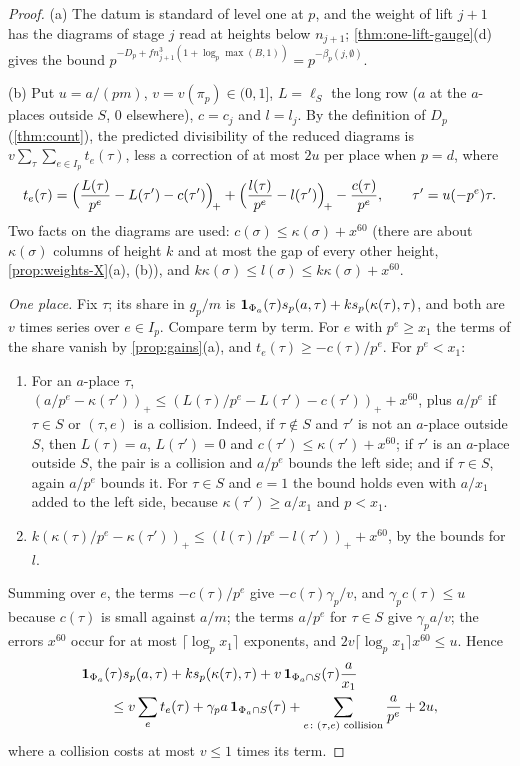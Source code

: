 \begin{proof}
(a) The datum is standard of level one at $p$, and the weight of lift $j+1$ has the diagrams of stage $j$ read at heights below $n_{j+1}$; \cref{thm:one-lift-gauge}(d) gives the bound $p^{-D_p+fn_{j+1}^3(1+\log_p\max(B,1))}=p^{-\beta_p(j,\emptyset)}$.

(b) Put $u=a/(pm)$, $v=v(\pi_p)\in(0,1]$, $L=\ell_S$ the long row ($a$ at the $a$-places outside $S$, $0$ elsewhere), $c=c_j$ and $l=l_j$. By the definition of $D_p$ (\cref{thm:count}), the predicted divisibility of the reduced diagrams is $v\sum_\tau\sum_{e\in I_p}t_e(\tau)$, less a correction of at most $2u$ per place when $p=d$, where
\[
  t_e(\tau)=\Bigl(\frac{L(\tau)}{p^e}-L(\tau')-c(\tau')\Bigr)_{\!+}+\Bigl(\frac{l(\tau)}{p^e}-l(\tau')\Bigr)_{\!+}-\frac{c(\tau)}{p^e},
  \qquad\tau'=u(-p^e)\tau .
\]
Two facts on the diagrams are used: $c(\sigma)\le\kappa(\sigma)+x^{60}$ (there are about $\kappa(\sigma)$ columns of height $k$ and at most the gap of every other height, \cref{prop:weights-X}(a), (b)), and $k\kappa(\sigma)\le l(\sigma)\le k\kappa(\sigma)+x^{60}$.

\emph{One place.} Fix $\tau$; its share in $g_p/m$ is $\mathbf1_{\Phi_a}(\tau)s_p(a,\tau)+ks_p(\kappa(\tau),\tau)$, and both are $v$ times series over $e\in I_p$. Compare term by term. For $e$ with $p^e\ge x_1$ the terms of the share vanish by \cref{prop:gains}(a), and $t_e(\tau)\ge-c(\tau)/p^e$. For $p^e<x_1$:
\begin{enumerate}[label=\textup{(\roman*)}]
\item For an $a$-place $\tau$, $(a/p^e-\kappa(\tau'))_+\le(L(\tau)/p^e-L(\tau')-c(\tau'))_++x^{60}$, plus $a/p^e$ if $\tau\in S$ or $(\tau,e)$ is a collision. Indeed, if $\tau\notin S$ and $\tau'$ is not an $a$-place outside $S$, then $L(\tau)=a$, $L(\tau')=0$ and $c(\tau')\le\kappa(\tau')+x^{60}$; if $\tau'$ is an $a$-place outside $S$, the pair is a collision and $a/p^e$
bounds the left side; and if $\tau\in S$, again $a/p^e$ bounds it. For $\tau\in S$ and $e=1$ the bound holds even with $a/x_1$ added to the left side, because $\kappa(\tau')\ge a/x_1$ and $p<x_1$.
\item $k(\kappa(\tau)/p^e-\kappa(\tau'))_+\le(l(\tau)/p^e-l(\tau'))_++x^{60}$, by the bounds for $l$.
\end{enumerate}
Summing over $e$, the terms $-c(\tau)/p^e$ give $-c(\tau)\gamma_p/v$, and $\gamma_pc(\tau)\le u$ because $c(\tau)$ is small against $a/m$; the terms $a/p^e$ for $\tau\in S$ give $\gamma_pa/v$; the errors $x^{60}$ occur for at most $\lceil\log_px_1\rceil$ exponents, and $2v\lceil\log_px_1\rceil x^{60}\le u$. Hence
\begin{align*}
  &\mathbf1_{\Phi_a}(\tau)s_p(a,\tau)+ks_p(\kappa(\tau),\tau)+v\,\mathbf1_{\Phi_a\cap S}(\tau)\frac a{x_1}\\
  &\qquad\le v\sum_et_e(\tau)+\gamma_pa\,\mathbf1_{\Phi_a\cap S}(\tau)+\sum_{e\colon(\tau,e)\text{ collision}}\frac a{p^e}+2u ,
\end{align*}
where a collision costs at most $v\le1$ times its term.


\end{proof}
